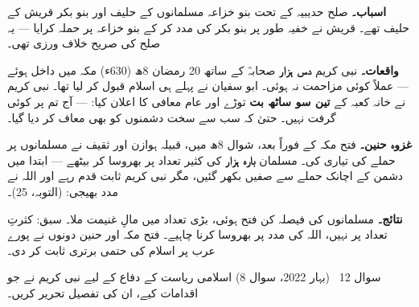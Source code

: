 \begin{hal}
\textbf{اسباب۔} صلح حدیبیہ کے تحت بنو خزاعہ مسلمانوں کے حلیف اور بنو بکر
قریش کے حلیف تھے۔ قریش نے خفیہ طور پر بنو بکر کی مدد کر کے بنو خزاعہ پر
حملہ کرایا --- یہ صلح کی صریح خلاف ورزی تھی۔

\medskip
\textbf{واقعات۔} نبی کریم \saw \textbf{دس ہزار} صحابہؓ کے ساتھ \textenglish{20}
رمضان \textenglish{8}ھ (\textenglish{630}ء) مکہ میں داخل ہوئے --- عملاً
کوئی مزاحمت نہ ہوئی۔ ابو سفیان نے پہلے ہی اسلام قبول کر لیا تھا۔ نبی کریم
\saw نے خانہ کعبہ کے \textbf{تین سو ساٹھ بت} توڑے اور عام معافی کا اعلان
کیا:  --- آج تم پر کوئی گرفت نہیں۔
حتیٰ کہ سب سے سخت دشمنوں کو بھی معاف کر دیا گیا۔

\medskip
\textbf{غزوہ حنین۔} فتح مکہ کے فوراً بعد، شوال \textenglish{8}ھ میں، قبیلہ
ہوازن اور ثقیف نے مسلمانوں پر حملے کی تیاری کی۔ مسلمان \textbf{بارہ ہزار}
کی کثیر تعداد پر بھروسا کر بیٹھے --- ابتدا میں دشمن کے اچانک حملے سے صفیں
بکھر گئیں، مگر نبی کریم \saw ثابت قدم رہے اور اللہ نے مدد بھیجی:
 (التوبہ، \textenglish{25})۔

\medskip
\textbf{نتائج۔} مسلمانوں کی فیصلہ کن فتح ہوئی، بڑی تعداد میں مالِ غنیمت
ملا۔ سبق: کثرتِ تعداد پر نہیں، اللہ کی مدد پر بھروسا کرنا چاہیے۔ فتح مکہ
اور حنین دونوں نے پورے عرب پر اسلام کی حتمی برتری ثابت کر دی۔
\end{hal}

\begin{sawal}{سوال \textenglish{12} \ \textnormal{\small(بہار \textenglish{2022}، سوال \textenglish{8})}}
اسلامی ریاست کے دفاع کے لیے نبی کریم \saw نے جو اقدامات کیے، ان کی تفصیل
تحریر کریں۔
\end{sawal}

